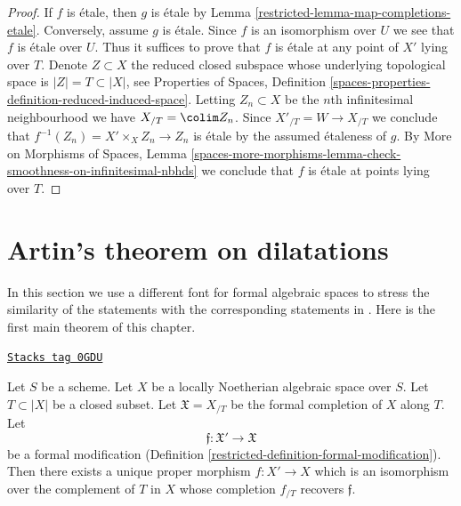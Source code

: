 \begin{proof}

If $f$ is \'etale, then $g$ is \'etale by
Lemma \ref{restricted-lemma-map-completions-etale}.
Conversely, assume $g$ is \'etale.
Since $f$ is an isomorphism over $U$ we see that $f$ is \'etale
over $U$. Thus it suffices to prove that $f$ is \'etale
at any point of $X'$ lying over $T$. Denote $Z \subset X$
the reduced closed subspace whose underlying topological
space is $|Z| = T \subset |X|$, see
Properties of Spaces, Definition
\ref{spaces-properties-definition-reduced-induced-space}.
Letting $Z_n \subset X$ be the $n$th infinitesimal neighbourhood
we have $X_{/T} = \colim Z_n$. Since $X'_{/T} = W \to X_{/T}$
we conclude that $f^{-1}(Z_n) = X' \times_X Z_n \to Z_n$
is \'etale by the assumed \'etaleness of $g$.
By More on Morphisms of Spaces, Lemma
\ref{spaces-more-morphisms-lemma-check-smoothness-on-infinitesimal-nbhds}
we conclude that $f$ is \'etale at points lying over $T$.
\end{proof}

\section{Artin's theorem on dilatations}
\label{restricted-section-dilatations}
In this section we use a different font for formal algebraic spaces
to stress the similarity of the statements with the corresponding
statements in \cite{ArtinII}. Here is the first main theorem of this chapter.

\begin{theorem}[Dilatations]
\label{restricted-theorem-dilatations}
\href{https://stacks.math.columbia.edu/tag/0GDU}{\texttt{Stacks tag 0GDU}}

\begin{reference}
\cite[Theorem 3.2]{ArtinII}
\end{reference}
Let $S$ be a scheme. Let $X$ be a locally Noetherian algebraic space over $S$.
Let $T \subset |X|$ be a closed subset. Let
$\mathfrak X = X_{/T}$
be the formal completion of $X$ along $T$. Let
$$
\mathfrak f : \mathfrak X' \to \mathfrak X
$$
be a formal modification (Definition \ref{restricted-definition-formal-modification}).
Then there exists a unique proper morphism $f : X' \to X$ which is an
isomorphism over the complement of $T$ in $X$ whose completion $f_{/T}$
recovers $\mathfrak f$.
\end{theorem}

